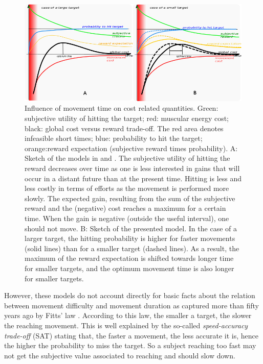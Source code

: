 \documentclass[pdftex,a4paper,12pt]{report}
\begin{document}
\begin{figure}[hbt]
\centering
	\includegraphics[width=1.0\columnwidth]{images/canu_fig3T.png}
\caption{Influence of movement time on cost related quantities.
Green: subjective utility of hitting the target; red: muscular energy cost; black: global cost versus reward trade-off. The red area denotes infeasible short times; blue: probability to hit the target; orange:reward expectation (subjective reward times probability).
 A: Sketch of the models in \cite{shadmehr10} and \cite{rigoux12_plos}.
The subjective utility of hitting the reward decreases over time as one is less interested in gains that will occur in a distant future than at the present time. Hitting is less and less costly in terms of efforts as the movement is performed more slowly.
The expected gain, resulting from the sum of the subjective reward and the (negative) cost reaches a maximum for a certain time. When the gain is negative (outside the useful interval), one should not move.
B: Sketch of the presented model.
In the case of a larger target, the hitting probability is higher for faster movements (solid lines) than for a smaller target (dashed lines). As a result, the maximum of the reward expectation is shifted towards longer time for smaller targets, and the optimum movement time is also longer for smaller targets.\label{fig:mvt_acc}}
\end{figure}

However, these models do not account directly for basic facts about the relation between movement difficulty and movement duration as captured more than fifty years ago by Fitts' law \cite{fitts54_JEP}.
According to this law, the smaller a target, the slower the reaching movement. 
This is well explained by the so-called {\em speed-accuracy trade-off} (SAT) stating that, the faster a movement, the less accurate it is, hence the higher the probability to miss the target. So a subject reaching too fast may not get the subjective value associated to reaching and should slow down.
\end{document}

